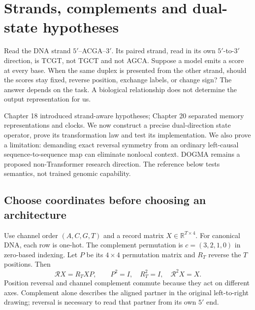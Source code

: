 \chapter{Strands, complements and dual-state hypotheses}

Read the DNA strand $5'$--ACGA--$3'$. Its paired strand, read in its own
$5'$-to-$3'$ direction, is TCGT, not TGCT and not AGCA. Suppose a model emits a
score at every base. When the same duplex is presented from the other strand,
should the scores stay fixed, reverse position, exchange labels, or change sign?
The answer depends on the task. A biological relationship does not determine
the output representation for us.

Chapter 18 introduced strand-aware hypotheses; Chapter 20 separated memory
representations and clocks. We now construct a precise dual-direction state
operator, prove its transformation law and test its implementation. We also
prove a limitation: demanding exact reversal symmetry from an ordinary
left-causal sequence-to-sequence map can eliminate nonlocal context. DOGMA
remains a proposed non-Transformer research direction. The reference below
tests semantics, not trained genomic capability.

\section{Choose coordinates before choosing an architecture}

Use channel order $(A,C,G,T)$ and a record matrix $X\in\mathbb R^{T\times4}$.
For canonical DNA, each row is one-hot. The complement permutation is
$c=(3,2,1,0)$ in zero-based indexing. Let $P$ be its $4\times4$ permutation
matrix and $R_T$ reverse the $T$ positions. Then
\begin{equation}
 \mathcal R X=R_TXP,\qquad P^2=I,\quad R_T^2=I,\quad
 \mathcal R^2X=X .
 \label{eq:rc}
\end{equation}
Position reversal and channel complement commute because they act on different
axes. Complement alone describes the aligned partner in the original
left-to-right drawing; reversal is necessary to read that partner from its
own $5'$ end.



